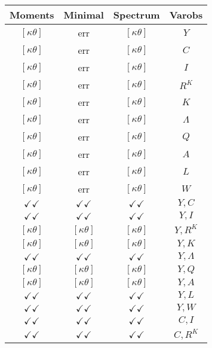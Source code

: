 \documentclass[a4paper,10pt]{article}
\begin{document}
\centering
\begin{longtable}{|c|c|c|c|}
\hline
Moments & Minimal & Spectrum & Varobs \\
\hline
$[\kappa \theta ]$ & err & $[\kappa \theta ]$ & ${Y}$ \\
\hline
$[\kappa \theta ]$ & err & $[\kappa \theta ]$ & ${C}$ \\
\hline
$[\kappa \theta ]$ & err & $[\kappa \theta ]$ & ${I}$ \\
\hline
$[\kappa \theta ]$ & err & $[\kappa \theta ]$ & ${R^{K}}$ \\
\hline
$[\kappa \theta ]$ & err & $[\kappa \theta ]$ & ${K}$ \\
\hline
$[\kappa \theta ]$ & err & $[\kappa \theta ]$ & ${\Lambda}$ \\
\hline
$[\kappa \theta ]$ & err & $[\kappa \theta ]$ & ${Q}$ \\
\hline
$[\kappa \theta ]$ & err & $[\kappa \theta ]$ & ${A}$ \\
\hline
$[\kappa \theta ]$ & err & $[\kappa \theta ]$ & ${L}$ \\
\hline
$[\kappa \theta ]$ & err & $[\kappa \theta ]$ & ${W}$ \\
\hline
$\checkmark\checkmark$ & $\checkmark\checkmark$ & $\checkmark\checkmark$ & ${Y},{C}$ \\
\hline
$\checkmark\checkmark$ & $\checkmark\checkmark$ & $\checkmark\checkmark$ & ${Y},{I}$ \\
\hline
$[\kappa \theta ]$ & $[\kappa \theta ]$ & $[\kappa \theta ]$ & ${Y},{R^{K}}$ \\
\hline
$[\kappa \theta ]$ & $[\kappa \theta ]$ & $[\kappa \theta ]$ & ${Y},{K}$ \\
\hline
$\checkmark\checkmark$ & $\checkmark\checkmark$ & $\checkmark\checkmark$ & ${Y},{\Lambda}$ \\
\hline
$[\kappa \theta ]$ & $[\kappa \theta ]$ & $[\kappa \theta ]$ & ${Y},{Q}$ \\
\hline
$[\kappa \theta ]$ & $[\kappa \theta ]$ & $[\kappa \theta ]$ & ${Y},{A}$ \\
\hline
$\checkmark\checkmark$ & $\checkmark\checkmark$ & $\checkmark\checkmark$ & ${Y},{L}$ \\
\hline
$\checkmark\checkmark$ & $\checkmark\checkmark$ & $\checkmark\checkmark$ & ${Y},{W}$ \\
\hline
$\checkmark\checkmark$ & $\checkmark\checkmark$ & $\checkmark\checkmark$ & ${C},{I}$ \\
\hline
$\checkmark\checkmark$ & $\checkmark\checkmark$ & $\checkmark\checkmark$ & ${C},{R^{K}}$ \\

\end{longtable}
\end{document}
